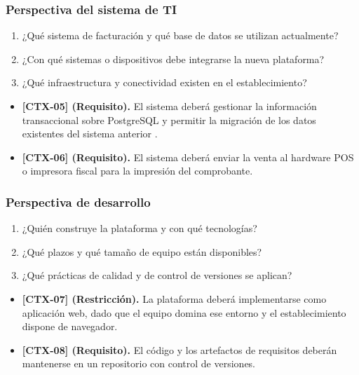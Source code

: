 \documentclass[onecolumn,12pt,a4paper]{IEEEtran}
\begin{document}
\subsubsection{Perspectiva del sistema de TI}
\begin{enumerate}
  \item ¿Qu\'e sistema de facturaci\'on y qu\'e base de datos se utilizan actualmente?
  \item ¿Con qu\'e sistemas o dispositivos debe integrarse la nueva plataforma?
  \item ¿Qu\'e infraestructura y conectividad existen en el establecimiento?
\end{enumerate}
\begin{itemize}
  \item \textbf{[CTX-05] (Requisito).} El sistema deber\'a gestionar la informaci\'on transaccional sobre PostgreSQL y permitir la migraci\'on de los datos existentes del sistema anterior \cite{iso12207}.
  \item \textbf{[CTX-06] (Requisito).} El sistema deber\'a enviar la venta al hardware POS o impresora fiscal para la impresi\'on del comprobante.
\end{itemize}

\subsubsection{Perspectiva de desarrollo}
\begin{enumerate}
  \item ¿Qui\'en construye la plataforma y con qu\'e tecnolog\'ias?
  \item ¿Qu\'e plazos y qu\'e tama\~no de equipo est\'an disponibles?
  \item ¿Qu\'e pr\'acticas de calidad y de control de versiones se aplican?
\end{enumerate}
\begin{itemize}
  \item \textbf{[CTX-07] (Restricci\'on).} La plataforma deber\'a implementarse como aplicaci\'on web, dado que el equipo domina ese entorno y el establecimiento dispone de navegador.
  \item \textbf{[CTX-08] (Requisito).} El c\'odigo y los artefactos de requisitos deber\'an mantenerse en un repositorio con control de versiones.
\end{itemize}
\end{document}
